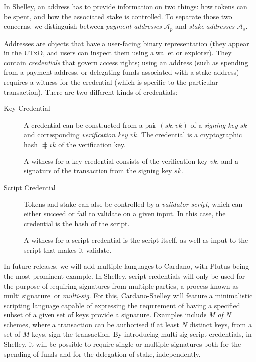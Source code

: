 \documentclass[11pt,a4paper,dvipsnames,twosided]{article}
\begin{document}
In Shelley, an address has to provide information on two things: how tokens can
be spent, and how the associated stake is controlled. To separate those two
concerns, we distinguish between \emph{payment addresses} \(\mathcal{A}_p\) and
\emph{stake addresses} \(\mathcal{A}_s\).

Addresses are objects that have a user-facing binary representation (they appear
in the UTxO, and users can inspect them using a wallet or explorer). They
contain \emph{credentials} that govern access rights; using an address (such as
spending from a payment address, or delegating funds associated with a stake
address) requires a witness for the credential (which is specific to the
particular transaction). There are two different kinds of credentials:

\begin{description}
\item[Key Credential] A credential can be constructed from a pair \((sk,
  vk)\) of a \emph{signing key} \(sk\) and corresponding \emph{verification key}
  \(vk\). The credential is a cryptographic hash \(\hash{vk}\) of the
  verification key.

  A witness for a key credential consists of the verification key \(vk\), and a
  signature of the transaction from the signing key \(sk\).
\item[Script Credential] Tokens and stake can also be controlled by a
  \emph{validator script}, which can either succeed or fail to validate on a
  given input. In this case, the credential is the hash of the script.

  A witness for a script credential is the script itself, as well as input to
  the script that makes it validate.
\end{description}

In future releases, we will add multiple languages to Cardano, with Plutus being
the most prominent example. In Shelley, script credentials will only be used for
the purpose of requiring signatures from multiple parties, a process known as
multi signature, or \emph{multi-sig}. For this, Cardano-Shelley will feature a
minimalistic scripting language capable of expressing the requirement of having
a specified subset of a given set of keys provide a signature. Examples include
\emph{M of N} schemes, where a transaction can be authorised if at least \(N\)
distinct keys, from a set of \(M\) keys, sign the transaction.
%
By introducing multi-sig script credentials, in Shelley, it will be possible to
require single or multiple signatures both for the spending of funds and for the
delegation of stake, independently.
\end{document}
